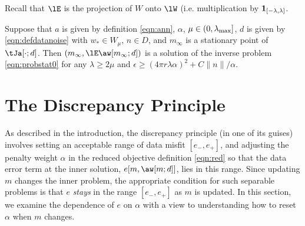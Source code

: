 Recall that $\lE$ is the projection of $W$ onto $\lW$
(i.e. multiplication by ${\bf 1}_{[-\lambda,\lambda]}$.

\begin{theorem}
  \label{thm:ipnoisesuf}
  Suppose that $a$ is given by definition \ref{eqn:ann}, $\alpha$,
  $\mu \in (0,\lambda_{\rm max}]$, $d$ is given by
  \ref{eqn:defdatanoise} with $w_* \in W_{\mu}$, $n \in D$, and
  $m_{\infty}$ is a stationary point of $\tJa[\cdot;d]$. Then
  $(m_{\infty},\lE\aw[m_{\infty};d])$ is a solution of the inverse
  problem \ref{eqn:probstat0} for any $\lambda \ge 2\mu$ and
  $\epsilon \ge (4\pi r \lambda \alpha)^2 + C\|n\|/\alpha$.
\end{theorem}

\section{The Discrepancy Principle}
As described in the introduction, the discrepancy principle (in one of
its guises) involves setting an acceptable range of data misfit
$[e_-,e_+]$, and adjusting the penalty weight $\alpha$ in the reduced
objective definition \ref{eqn:red} so that the data error term at the
inner solution, $e[m,\aw[m;d]]$, lies in this range. Since updating
$m$ changes the inner problem, the appropriate condition for such
separable problems is that $e$ {\em stays} in the range $[e_-,e_+]$ as
$m$ is updated. In this section, we examine the dependence of $e$
on $\alpha$ with a view to understanding how to reset $\alpha$ when
$m$ changes.

